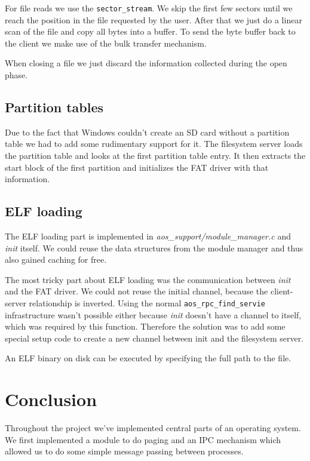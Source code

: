 \documentclass[a4paper,10pt]{article}
\newcommand{\filepath}[1]{\emph{ #1}}
\begin{document}
For file reads we use the \lstinline!sector_stream!.
We skip the first few sectors until we reach the position in the file requested by the user.
After that we just do a linear scan of the file and copy all bytes into a buffer.
To send the byte buffer back to the client we make use of the bulk transfer mechanism.

When closing a file we just discard the information collected during the open phase.

\subsection{Partition tables}
Due to the fact that Windows couldn't create an SD card without a partition table we had to add some rudimentary support for it.
The filesystem server loads the partition table and looks at the first partition table entry.
It then extracts the start block of the first partition and initializes the FAT driver with that information.

\subsection{ ELF loading}

The ELF loading part is implemented in \filepath{aos\_support/module\_manager.c} and \emph{init} itself.
We could reuse the data structures from the module manager and thus also gained caching for free.

The most tricky part about ELF loading was the communication between \emph{init} and the FAT driver.
We could not reuse the initial channel, because the client-server relationship is inverted.
Using the normal \lstinline!aos_rpc_find_servie! infrastructure wasn't possible either because \emph{init} doesn't have a channel to itself, which was required by this function.
Therefore the solution was to add some special setup code to create a new channel between init and the filesystem server.

An ELF binary on disk can be executed by specifying the full path to the file.


\section{Conclusion}
Throughout the project we've implemented central parts of an operating system.
We first implemented a module to do paging and an IPC mechanism which allowed us to do some simple message passing between processes.
\end{document}
